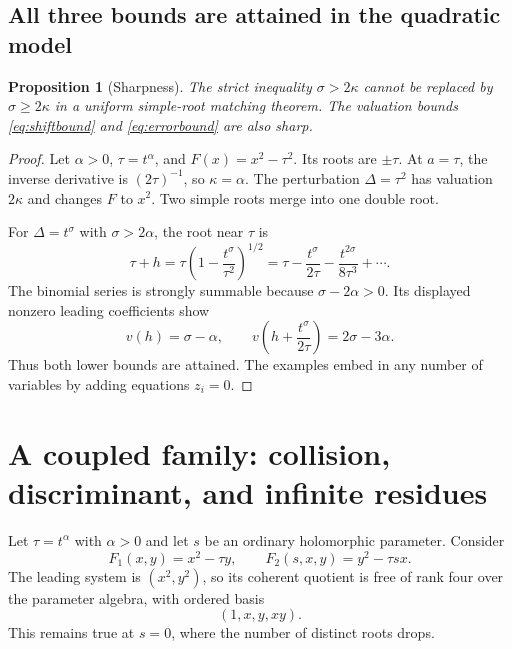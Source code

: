 \documentclass[11pt,letterpaper]{article}
\newtheorem{proposition}[theorem]{Proposition}
\theoremstyle{definition}
\theoremstyle{remark}
\numberwithin{equation}{section}
\begin{document}
\subsection{All three bounds are attained in the quadratic model}
\begin{proposition}[Sharpness]\label{prop:sharpness}
The strict inequality $\sigma>2\kappa$ cannot be replaced by $\sigma\ge2\kappa$ in a uniform simple-root matching theorem. The valuation bounds \eqref{eq:shiftbound} and \eqref{eq:errorbound} are also sharp.
\end{proposition}
\begin{proof}
Let $\alpha>0$, $\tau=t^\alpha$, and $F(x)=x^2-\tau^2$. Its roots are $\pm\tau$. At $a=\tau$, the inverse derivative is $(2\tau)^{-1}$, so $\kappa=\alpha$. The perturbation $\Delta=\tau^2$ has valuation $2\kappa$ and changes $F$ to $x^2$. Two simple roots merge into one double root.

For $\Delta=t^\sigma$ with $\sigma>2\alpha$, the root near $\tau$ is
\[
 \tau+h=\tau\left(1-\frac{t^\sigma}{\tau^2}\right)^{1/2}
 =\tau-\frac{t^\sigma}{2\tau}
       -\frac{t^{2\sigma}}{8\tau^3}+\cdots.
\]
The binomial series is strongly summable because $\sigma-2\alpha>0$. Its displayed nonzero leading coefficients show
\[
 v(h)=\sigma-\alpha,\qquad
 v\left(h+\frac{t^\sigma}{2\tau}\right)=2\sigma-3\alpha.
\]
Thus both lower bounds are attained. The examples embed in any number of variables by adding equations $z_i=0$.
\end{proof}

\section{A coupled family: collision, discriminant, and infinite residues}\label{sec:example}
Let $\tau=t^\alpha$ with $\alpha>0$ and let $s$ be an ordinary holomorphic parameter. Consider
\begin{equation}\label{eq:example}
 F_1(x,y)=x^2-\tau y,\qquad
 F_2(s,x,y)=y^2-\tau sx.
\end{equation}
The leading system is $(x^2,y^2)$, so its coherent quotient is free of rank four over the parameter algebra, with ordered basis
\[
 (1,x,y,xy).
\]
This remains true at $s=0$, where the number of distinct roots drops.
\end{document}
